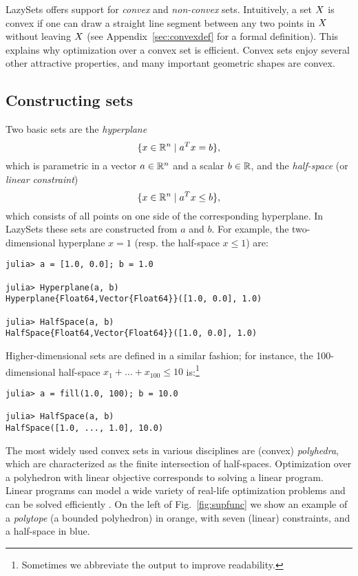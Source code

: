 LazySets offers support for \emph{convex} and \emph{non-convex} sets.
%
Intuitively, a set $X$ is convex if one can draw a straight line segment between any two points in $X$ without leaving $X$ (see Appendix~\ref{sec:convexdef} for a formal definition).
This explains why optimization over a convex set is efficient.
Convex sets enjoy several other attractive properties, and many important geometric shapes are convex.
%

\subsection{Constructing sets}

Two basic sets are the \emph{hyperplane}
%
\[
	\{x \in \mathbb{R}^n \mid a^T x = b\},
\]
%
which is parametric in a vector $a \in \mathbb{R}^n$ and a scalar $b \in \mathbb{R}$, and the \emph{half-space} (or \emph{linear constraint})
%
\[
	\{x \in \mathbb{R}^n \mid a^T x \leq b\},
\]
%
which consists of all points on one side of the corresponding hyperplane.
In LazySets these sets are constructed from $a$ and $b$. For example, the two-dimensional hyperplane $x = 1$ (resp. the half-space $x \leq 1$) are:

\begin{minipage}{\linewidth}
\vspace{-\abovedisplayskip}
\begin{lstlisting}
julia> a = [1.0, 0.0]; b = 1.0

julia> Hyperplane(a, b)
Hyperplane{Float64,Vector{Float64}}([1.0, 0.0], 1.0)

julia> HalfSpace(a, b)
HalfSpace{Float64,Vector{Float64}}([1.0, 0.0], 1.0)
\end{lstlisting}
\end{minipage}
%
Higher-dimensional sets are defined in a similar fashion; for instance, the 100-dimensional half-space $x_1 + \ldots + x_{100} \leq 10$ is:\footnote{Sometimes we abbreviate the output to improve readability.}
%
\begin{minipage}{\linewidth}
\vspace{-\abovedisplayskip}
	\begin{lstlisting}
julia> a = fill(1.0, 100); b = 10.0

julia> HalfSpace(a, b)
HalfSpace([1.0, ..., 1.0], 10.0)
	\end{lstlisting}
\end{minipage}


The most widely used convex sets in various disciplines are (convex) \emph{polyhedra}, which are characterized as the finite intersection of half-spaces.
Optimization over a polyhedron with linear objective corresponds to solving a linear program.
Linear programs can model a wide variety of real-life optimization problems and can be solved efficiently \cite{dantzig1998linear,kochenderfer2019algorithms}.
On the left of Fig.~\ref{fig:supfunc} we show an example of a \emph{polytope} (a bounded polyhedron) in orange, with seven (linear) constraints, and a half-space in blue.

